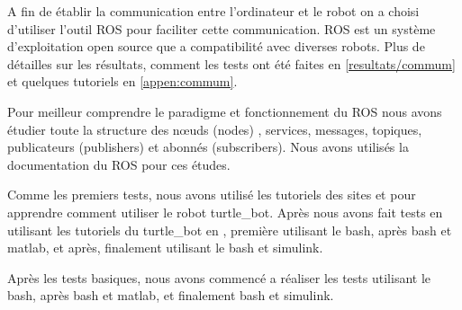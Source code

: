 
A fin de établir la communication entre l'ordinateur et le robot on a choisi d'utiliser l'outil ROS pour faciliter cette communication. ROS est un système d'exploitation open source que a compatibilité avec diverses robots. Plus de détailles sur les résultats, comment les tests ont été faites en \ref{resultats/commum}  et quelques tutoriels en \ref{appen:commum}.

Pour meilleur comprendre le paradigme et fonctionnement du ROS nous avons étudier toute la structure des n\oe{}uds (nodes) , services, messages, topiques, publicateurs (publishers) et abonnés (subscribers). Nous avons utilisés la documentation du ROS \cite{rosdoc} pour ces études. 

Comme les premiers tests, nous avons utilisé les tutoriels des sites \cite{matlabrobotics} et \cite{rosdoc} pour apprendre comment utiliser le robot turtle\_bot. Après nous avons fait tests en utilisant les tutoriels du turtle\_bot en \cite{matlabrobotics}, première utilisant le bash, après bash et matlab, et après, finalement utilisant le  bash et simulink.

Après les tests basiques, nous avons commencé a réaliser les tests utilisant le bash, après bash et matlab, et finalement bash et simulink. 
